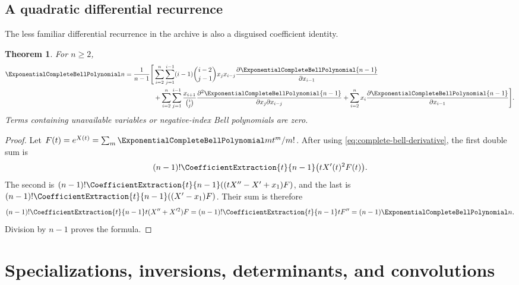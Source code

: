 \documentclass[11pt,a4paper,oneside,openany]{book}
\newtheorem{theorem}{Theorem}[chapter]
\theoremstyle{definition}
\theoremstyle{remark}
\begin{document}
\section{A quadratic differential recurrence}
The less familiar differential recurrence in the archive is also a disguised
coefficient identity.
\begin{theorem}\label{thm:bell-quadratic-differential}
For $n\ge2$,
\begin{align}
 \ExponentialCompleteBellPolynomial n=\frac1{n-1}\Bigg[&
 \sum_{i=2}^{n}\sum_{j=1}^{i-1}(i-1)\binom{i-2}{j-1}x_jx_{i-j}
       \frac{\partial\ExponentialCompleteBellPolynomial{n-1}}{\partial x_{i-1}}\notag\\
 &+\sum_{i=2}^{n}\sum_{j=1}^{i-1}\frac{x_{i+1}}{\binom ij}
       \frac{\partial^2\ExponentialCompleteBellPolynomial{n-1}}{\partial x_j\partial x_{i-j}}
 +\sum_{i=2}^{n}x_i\frac{\partial\ExponentialCompleteBellPolynomial{n-1}}{\partial x_{i-1}}
 \Bigg].
 \label{eq:bell-quadratic-differential}
\end{align}
Terms containing unavailable variables or negative-index Bell polynomials are zero.
\end{theorem}
\begin{proof}
Let $F(t)=e^{X(t)}=\sum_m\ExponentialCompleteBellPolynomial m t^m/m!$.  After using
\eqref{eq:complete-bell-derivative}, the first double sum is
\[
 (n-1)!\CoefficientExtraction{t}{n-1}\bigl(tX'(t)^2F(t)\bigr).
\]
The second is
$(n-1)!\CoefficientExtraction{t}{n-1}((tX''-X'+x_1)F)$, and the last is
$(n-1)!\CoefficientExtraction{t}{n-1}((X'-x_1)F)$.  Their sum is therefore
\[
 (n-1)!\CoefficientExtraction{t}{n-1}t(X''+X'^2)F
 =(n-1)!\CoefficientExtraction{t}{n-1}tF''=(n-1)\ExponentialCompleteBellPolynomial n.
\]
Division by $n-1$ proves the formula.
\end{proof}

\chapter{Specializations, inversions, determinants, and convolutions}
\end{document}
